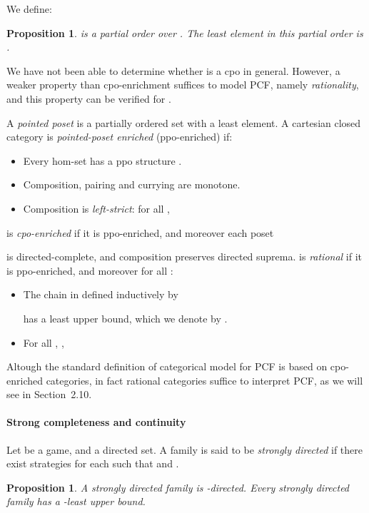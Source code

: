\documentclass[11pt]{article}
\newtheorem{proposition}[theorem]{Proposition}
\begin{document}
We define:



\begin{proposition}
 is a partial order over  . The least element
in this partial order is .
\end{proposition}

We have not been able to determine whether  is
a cpo in general. However, a weaker property than cpo-enrichment suffices
to model PCF, namely {\em rationality}, and this property can be
verified for .

A {\em pointed poset} is a partially ordered set with a least element.
A cartesian closed category  is {\em pointed-poset enriched}
(ppo-enriched) if:
\begin{itemize}
\item Every hom-set  has a ppo structure
.
\item Composition, pairing and currying are monotone.
\item Composition is {\em left-strict}: for all ,

\end{itemize}
 is {\em cpo-enriched} if it is ppo-enriched, and moreover
each poset

is directed-complete,
and composition preserves directed suprema.
 is {\em rational}  if it is ppo-enriched, and moreover
for all :
\begin{itemize}
\item The chain  in 
defined inductively by

has a least upper bound, which we denote by .
\item For all , ,

\end{itemize}
Altough the standard definition of categorical model for PCF is based on
cpo-enriched categories, in fact rational categories suffice to interpret
PCF, as we will see in Section~2.10.

\paragraph{Strong completeness and continuity}
Let  be a game, and  a directed set.
A family  is said to be
{\em strongly directed} if there exist strategies  for each
 such that 
and .

\begin{proposition}
A strongly directed family is -directed.
Every strongly directed family has a -least upper bound.
\end{proposition}
\end{document}
